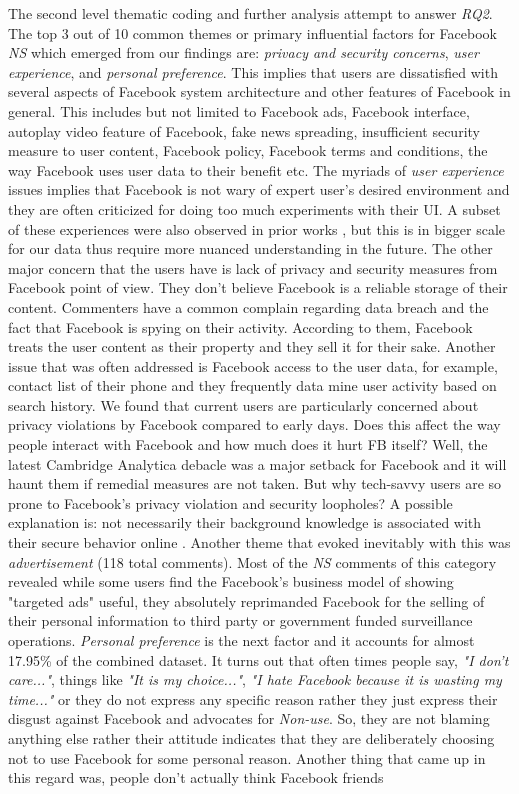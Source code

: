 The second level thematic coding and further analysis attempt to answer \emph{RQ2}. The top 3 out of 10 common themes or primary influential factors for Facebook \textit{NS} which emerged from our findings are: \textit{privacy and security concerns}, \textit{user experience}, and \textit{personal preference}. This implies that users are dissatisfied with several aspects of Facebook system architecture and other features of Facebook in general. This includes but not limited to Facebook ads, Facebook interface, autoplay video feature of Facebook, fake news spreading, insufficient security measure to user content, Facebook policy, Facebook terms and conditions, the way Facebook uses user data to their benefit etc. The myriads of \textit{user experience} issues implies that Facebook is not wary of expert user's desired environment and they are often criticized for doing too much experiments with their UI. A subset of these experiences were also observed in prior works \cite{lampe2013users, baumer2013limiting, baker2011their}, but this is in bigger scale for our data thus require more nuanced understanding in the future. The other major concern that the users have is lack of privacy and security measures from Facebook point of view. They don't believe Facebook is a reliable storage of their content. Commenters have a common complain regarding data breach and the fact that Facebook is spying on their activity. According to them, Facebook treats the user content as their property and they sell it for their sake. Another issue that was often addressed is Facebook access to the user data, for example, contact list of their phone and they frequently data mine user activity based on search history. We found that current users are particularly concerned about privacy violations by Facebook compared to early days. Does this affect the way people interact with Facebook and how much does it hurt FB itself? Well, the latest Cambridge Analytica debacle was a major setback for Facebook and it will haunt them if remedial measures are not taken. But why tech-savvy users are so prone to Facebook's privacy violation and security loopholes? A possible explanation is: not necessarily their background knowledge is associated with their secure behavior online \cite{kang2015my}. Another theme that evoked inevitably with this was \textit{advertisement} (118 total comments). Most of the \emph{NS} comments of this category revealed while some users find the Facebook's business model of showing "targeted ads" useful, they absolutely reprimanded Facebook for the selling of their personal information to third party or government funded surveillance operations. \textit{Personal preference} is the next factor and it accounts for almost 17.95\% of the combined dataset. It turns out that often times people say, \textit{"I don't care..."}, things like \textit{"It is my choice..."}, \textit{"I hate Facebook because it is wasting my time..."} or they do not express any specific reason rather they just express their disgust against Facebook and advocates for \emph{Non-use}. So, they are not blaming anything else rather their attitude indicates that they are deliberately choosing not to use Facebook for some personal reason. Another thing that came up in this regard was, people don't actually think Facebook friends 